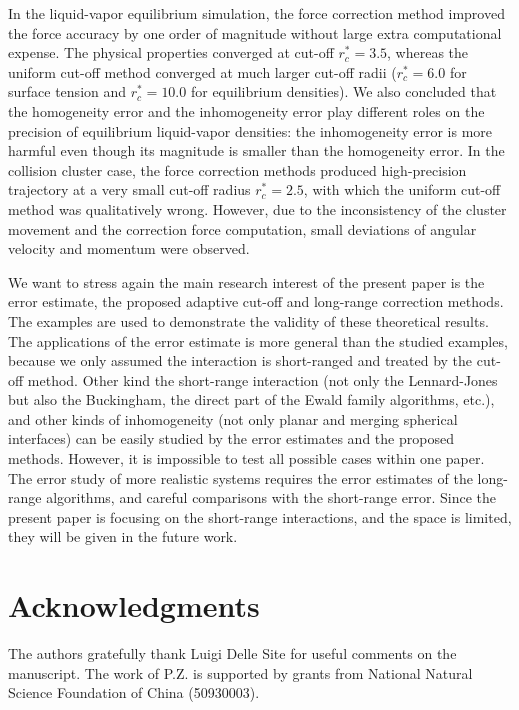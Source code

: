 \documentclass[aps, pre, preprint]{revtex4}
\begin{document}
In the liquid-vapor equilibrium simulation, the
force correction method improved the force accuracy by one order of
magnitude without large extra computational expense. The physical
properties converged at cut-off $r_c^\ast = 3.5$, whereas the uniform
cut-off method converged at much larger cut-off radii ($r_c^\ast = 6.0$
for surface tension and $r_c^\ast = 10.0$ for equilibrium
densities). {
We also concluded that the homogeneity
error and the inhomogeneity error play different roles on the precision
of equilibrium liquid-vapor densities: the inhomogeneity error
is more harmful even though its magnitude is smaller than the homogeneity
error.}
In the collision cluster case,
the force correction methods produced high-precision trajectory at a
very small cut-off radius $r_c^\ast=2.5$, with which the uniform
cut-off method was qualitatively wrong. However, due to the
inconsistency of the cluster movement and the correction force
computation, small deviations of angular velocity and momentum were
observed.

{
  We want to stress again the main research interest of the present paper is the
  error estimate, the proposed adaptive cut-off and long-range
  correction methods. The examples are used to demonstrate
  the validity of these theoretical results. The applications
  of the error estimate is more general than the studied examples,
  because we only assumed the interaction is short-ranged and
  treated by the cut-off method.
  Other kind the short-range interaction (not only the Lennard-Jones
  but also the Buckingham,
  the direct part of the Ewald family algorithms, etc.),
  and other kinds of inhomogeneity
  (not only  planar and merging spherical interfaces)
  can be easily studied by the error estimates and the proposed methods.
  However, it is impossible to test all possible cases within one paper.
  The error study of
  more realistic systems requires the error estimates of the long-range
  algorithms, and careful comparisons with the short-range error.
  Since the present paper is focusing on the short-range
  interactions, and the space is limited,
  they will be given in the future work.
}


\section*{Acknowledgments}
The authors gratefully thank Luigi Delle Site for useful comments
on the manuscript. The work of P.Z. is supported by grants from
National Natural Science Foundation of China (50930003).



{}

\end{document}
